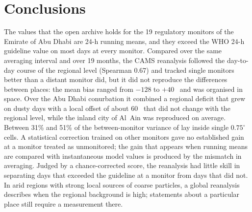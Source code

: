 \section{Conclusions}

The \pmten{} values that the open archive holds for the 19 regulatory monitors of the Emirate of
Abu Dhabi are 24-h running means, and they exceed the WHO 24-h guideline value on most days at
every monitor. Compared over the same averaging interval and over 19 months, the CAMS reanalysis
followed the day-to-day course of the regional level (Spearman 0.67) and tracked single monitors
better than a distant monitor did, but it did not reproduce the differences between places: the
mean bias ranged from $-128$ to $+40$~\ugm{} and was organised in space. Over the Abu Dhabi
conurbation it combined a regional deficit that grew on dusty days with a local offset of about
60~\ugm{} that did not change with the regional level, while the inland city of Al~Ain was
reproduced on average. Between 31\% and 51\% of the between-monitor variance of \pmten{} lay
inside single $0.75^{\circ}$ cells. A statistical correction trained on other monitors gave
no established gain at a monitor treated as unmonitored; the gain that appears when running means
are compared with instantaneous model values is produced by the mismatch in averaging. Judged by a chance-corrected score, the
reanalysis had little skill in separating days that exceeded the guideline at a monitor from days
that did not. In arid regions with strong local sources of coarse particles, a global reanalysis
describes when the regional background is high; statements about a particular place still require
a measurement there.
